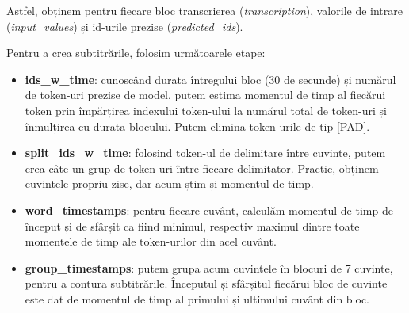 Astfel, obținem pentru fiecare bloc transcrierea (\textit{transcription}), valorile de intrare (\textit{input\_values})
și id-urile prezise (\textit{predicted\_ids}).

\par
Pentru a crea subtitrările, folosim următoarele etape:

\begin{itemize}
    \item \textbf{ids\_w\_time}: cunoscând durata întregului bloc (30 de secunde) și numărul de token-uri
    prezise de model, putem estima momentul de timp al fiecărui token prin împărțirea indexului token-ului
    la numărul total de token-uri și înmulțirea cu durata blocului. Putem elimina token-urile de tip [PAD].
    \item \textbf{split\_ids\_w\_time}: folosind token-ul de delimitare între cuvinte, putem crea câte un 
    grup de token-uri între fiecare delimitator. Practic, obținem cuvintele propriu-zise, dar acum știm și
    momentul de timp.
    \item \textbf{word\_timestamps}: pentru fiecare cuvânt, calculăm momentul de timp de început și de sfârșit
    ca fiind minimul, respectiv maximul dintre toate momentele de timp ale token-urilor din acel cuvânt.
    \item \textbf{group\_timestamps}: putem grupa acum cuvintele în blocuri de 7 cuvinte, pentru a contura
    subtitrările. Începutul și sfârșitul fiecărui bloc de cuvinte este dat de momentul de timp al primului
    și ultimului cuvânt din bloc.
\end{itemize}

